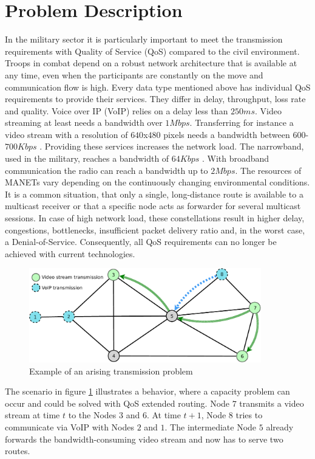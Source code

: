 \documentclass[runningheads]{llncs}
\newcommand{\MANET}{MANET}
\newcommand{\QOS}{QoS}
\newcommand{\VOIP}{VoIP}
\begin{document}
	\section{Problem Description}
	In the military sector it is particularly important to meet the transmission requirements with Quality of Service (\QOS{}) compared to the civil environment. Troops in combat depend on a robust network architecture that is available at any time, even when the participants are constantly on the move and communication flow is high. Every data type mentioned above has individual \QOS{} requirements to provide their services. They differ in delay, throughput, loss rate and quality. Voice over IP (\VOIP{}) relies on a delay less than $250ms$. Video streaming at least needs a bandwidth over $1Mbps$. Transferring for instance a video stream with a resolution of $640$x$480$ pixels needs a bandwidth between $600$-$700Kbps$ \cite{Video:Bandwidth}. Providing these services increases the network load. The narrowband, used in the military, reaches a bandwidth of $64Kbps$ \cite{military:narrowband}. With broadband communication the radio can reach a bandwidth up to $2Mbps$. The resources of \MANET{s} vary depending on the continuously changing environmental conditions. It is a common situation, that only a single, long-distance route is available to a multicast receiver or that a specific node acts as forwarder for several multicast sessions. In case of high network load, these constellations result in higher delay, congestions, bottlenecks, insufficient packet delivery ratio and, in the worst case, a Denial-of-Service. Consequently, all \QOS{} requirements can no longer be achieved with current technologies.
	\begin{figure}[hb]
		\centering
		\includegraphics[width=0.9\textwidth]{figures/MulticastCommunicationOne.pdf}
		\caption{Example of an arising transmission problem}
		\label{fig:multicast}
	\end{figure}
	The scenario in figure \ref{fig:multicast} illustrates a behavior, where a capacity problem can occur and could be solved with \QOS{} extended routing. Node $7$ transmits a video stream at time $t$ to the Nodes $3$ and $6$. At time $t+1$, Node $8$ tries to communicate via \VOIP{} with Nodes $2$ and $1$. The intermediate Node $5$ already forwards the bandwidth-consuming video stream and now has to serve two routes. 
	
\end{document}
